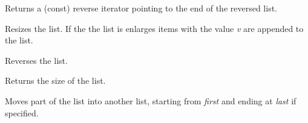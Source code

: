 \label{wxlistrend}



Returns a (const) reverse iterator pointing to the end of the
reversed list.

\label{wxlistresize}


Resizes the list. If the the list is enlarges items with
the value {\it v} are appended to the list.

\label{wxlistreverse}


Reverses the list.

\label{wxlistsize}


Returns the size of the list.

\label{wxlistsplice}




Moves part of the list into another list, starting from {\it first} and 
ending at {\it last} if specified.
